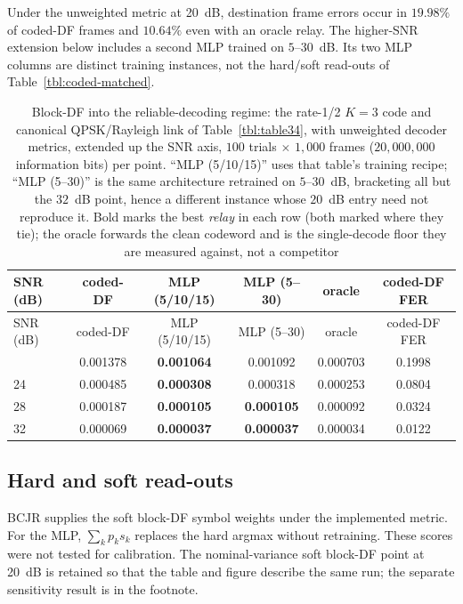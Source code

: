 Under the unweighted metric at 20~dB, destination frame errors occur in $19.98\%$ of coded-DF frames and $10.64\%$ even with an oracle relay. The higher-SNR extension below includes a second MLP trained on $5$--$30$~dB. Its two MLP columns are distinct training instances, not the hard/soft read-outs of Table~\ref{tbl:coded-matched}.

\begingroup\footnotesize
\begin{longtable}[]{@{}lccccc@{}}
\caption[Block-DF into the reliable-decoding regime]{Block-DF into the reliable-decoding regime: the rate-1/2 $K{=}3$ code and canonical QPSK/Rayleigh link of Table~\ref{tbl:table34}, with unweighted decoder metrics, extended up the SNR axis, $100$ trials $\times$ $1{,}000$ frames ($20{,}000{,}000$ information bits) per point. ``MLP (5/10/15)'' uses that table's training recipe; ``MLP (5--30)'' is the same architecture retrained on $5$--$30$~dB, bracketing all but the $32$~dB point, hence a different instance whose $20$~dB entry need not reproduce it. Bold marks the best \emph{relay} in each row (both marked where they tie); the oracle forwards the clean codeword and is the single-decode floor they are measured against, not a competitor}\label{tbl:table44}\tabularnewline
\toprule\noalign{}
SNR (dB) & coded-DF & MLP (5/10/15) & MLP (5--30) & oracle & coded-DF FER \\
\midrule\noalign{}
\endfirsthead
\toprule\noalign{}
SNR (dB) & coded-DF & MLP (5/10/15) & MLP (5--30) & oracle & coded-DF FER \\
\midrule\noalign{}
\endhead
\bottomrule\noalign{}
\endlastfoot
20 & 0.001378 & \textbf{0.001064} & 0.001092 & 0.000703 & 0.1998 \\
24 & 0.000485 & \textbf{0.000308} & 0.000318 & 0.000253 & 0.0804 \\
28 & 0.000187 & \textbf{0.000105} & \textbf{0.000105} & 0.000092 & 0.0324 \\
32 & 0.000069 & \textbf{0.000037} & \textbf{0.000037} & 0.000034 & 0.0122 \\
\end{longtable}
\endgroup

\subsection{Hard and soft read-outs}

BCJR supplies the soft block-DF symbol weights under the implemented metric. For the MLP, $\sum_k p_k s_k$ replaces the hard argmax without retraining. These scores were not tested for calibration. The nominal-variance soft block-DF point at 20~dB is retained so that the table and figure describe the same run; the separate sensitivity result is in the footnote.

